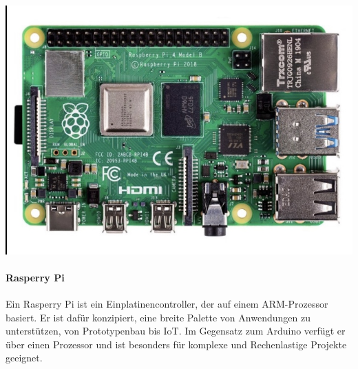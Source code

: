 \begin{minipage}{0.3\textwidth}
	\includegraphics [width=\textwidth] {img/RasperryPi}
\end{minipage}
\begin{minipage}{0.7\textwidth}
	\paragraph{Rasperry Pi}
	Ein Rasperry Pi ist ein Einplatinencontroller, der auf einem ARM-Prozessor basiert. Er ist dafür konzipiert, eine breite
	Palette von Anwendungen zu unterstützen, von Prototypenbau bis IoT.
	Im Gegensatz zum Arduino verfügt er über einen Prozessor und ist besonders für komplexe und Rechenlastige
	Projekte geeignet.
\end{minipage}
\newline


